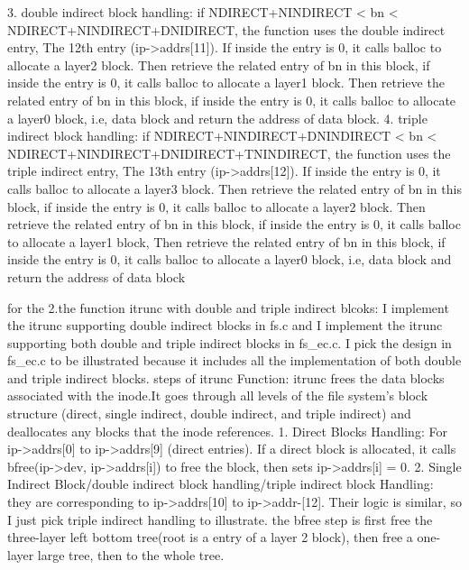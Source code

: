 \documentclass{article}
\begin{document}
3. double indirect block handling: if NDIRECT+NINDIRECT < bn < NDIRECT+NINDIRECT+DNIDIRECT, the function uses the double indirect entry, The 12th entry (ip->addrs[11]). If inside the entry is 0, it calls balloc to allocate a layer2 block. Then retrieve the related entry of bn in this block, if inside the entry is 0, it calls balloc to allocate a layer1 block. Then retrieve the related entry of bn in this block, if inside the entry is 0, it calls balloc to allocate a layer0 block, i.e, data block and return the address of data block.
4. triple indirect block handling: if NDIRECT+NINDIRECT+DNINDIRECT < bn < NDIRECT+NINDIRECT+DNIDIRECT+TNINDIRECT, the function uses the triple indirect entry, The 13th entry (ip->addrs[12]). If inside the entry is 0, it calls balloc to allocate a layer3 block. Then retrieve the related entry of bn in this block, if inside the entry is 0, it calls balloc to allocate a layer2 block. Then retrieve the related entry of bn in this block, if inside the entry is 0, it calls balloc to allocate a layer1 block, Then retrieve the related entry of bn in this block, if inside the entry is 0, it calls balloc to allocate a layer0 block, i.e, data block and return the address of data block

for the 2.the function itrunc with double and triple indirect blcoks:
I implement the itrunc supporting double indirect blocks in fs.c and I implement the itrunc supporting both double and triple indirect blocks in fs_ec.c.
I pick the design in fs_ec.c to be illustrated because it includes all the implementation of both double and triple indirect blocks.
steps of itrunc Function: itrunc frees the data blocks associated with the inode.It goes through all levels of the file system's block structure (direct, single indirect, double indirect, and triple indirect) and deallocates any blocks that the inode references.
1. Direct Blocks Handling:  For ip->addrs[0] to ip->addrs[9] (direct entries).  If a direct block is allocated, it calls bfree(ip->dev, ip->addrs[i]) to free the block, then sets ip->addrs[i] = 0.
2. Single Indirect Block/double indirect block handling/triple indirect block Handling: they are corresponding to ip->addrs[10] to ip->addr-[12]. Their logic is similar, so I just pick triple indirect handling to illustrate.
 the bfree step is first free the three-layer left bottom tree(root is a entry of a layer 2 block), then free a one-layer large tree, then to the whole tree.
\end{document}
